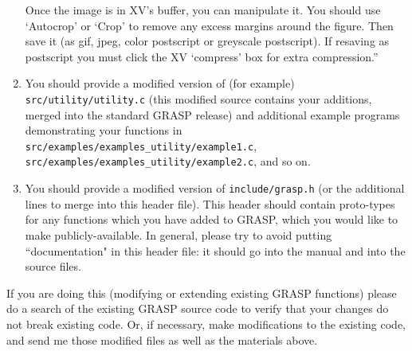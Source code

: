 \begin{enumerate}
Once the image is in XV's buffer, you can manipulate it. You should
use `Autocrop' or `Crop' to remove any excess margins around the
figure. Then save it (as gif, jpeg, color postscript or greyscale
postscript). If resaving as postscript you must click the XV
`compress' box for extra compression.'' 
\item
You should provide a modified version of (for example) {\tt src/utility/utility.c}
    (this modified source contains your additions, merged into the
    standard GRASP release) and additional example programs
    demonstrating your functions in\\
    {\tt src/examples/examples\_utility/example1.c}, \\
    {\tt src/examples/examples\_utility/example2.c}, and so on.
\item
You should provide a modified version of {\tt include/grasp.h} (or the
additional lines to merge into this header file).  This header should contain
proto-types for any functions which you have added to GRASP, which you would
like to make publicly-available. In general, please try to avoid putting
``documentation" in this header file: it should go into the manual and into
the source files.
\end{enumerate}
If you are doing this (modifying or extending existing GRASP
functions) please
do a search of the existing GRASP source code to verify that
your changes do not break existing code.  Or, if necessary, make
modifications to the existing code, and send me those modified files
as well as the materials above.

